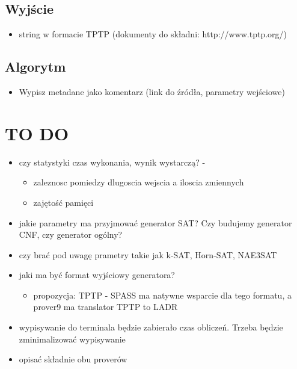 \documentclass[a4paper,12pt]{article}
\begin{document}
\subsection{Wyjście}
\begin{itemize}
\item string w formacie TPTP (dokumenty do składni: http://www.tptp.org/)
\end{itemize}

\subsection{Algorytm}
\begin{itemize}
\item Wypisz metadane jako komentarz (link do źródła, parametry wejściowe)
\end{itemize}

\newpage
\section{TO DO}
\begin{itemize}
\item czy statystyki czas wykonania, wynik wystarczą? - 
		\begin{itemize}
		\item zaleznosc pomiedzy dlugoscia wejscia a iloscia zmiennych
		\item zajętość pamięci		
		\end{itemize}
		
\item jakie parametry ma przyjmować generator SAT? Czy budujemy generator CNF, czy generator ogólny?
\item  czy brać pod uwagę prametry takie jak
k-SAT, Horn-SAT, NAE3SAT

\item jaki ma być format wyjściowy generatora? 
	\begin{itemize}
		\item propozycja: TPTP - SPASS ma natywne wsparcie dla tego formatu, a prover9 ma translator TPTP to LADR
	\end{itemize}

\item wypisywanie do terminala będzie zabierało czas obliczeń. Trzeba będzie zminimalizować wypisywanie
\item opisać składnie obu proverów

\end{itemize}

\newpage
\end{document}
